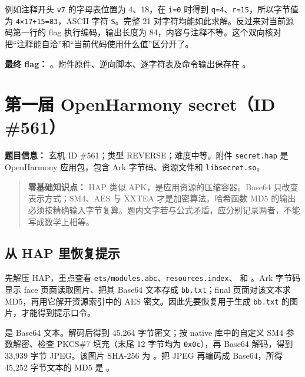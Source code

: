 例如注释开头 \texttt{v7} 的字母表位置为 4、18，在 \texttt{i=0} 时得到 \texttt{q=4}、\texttt{r=15}，所以字节值为 \texttt{4×17+15=83}，ASCII 字符 \texttt{S}。完整 21 对字符均能如此求解。反过来对当前源码第一行的 flag 执行编码，输出长度为 84，内容与注释不等。这个双向核对把``注释能自洽''和``当前代码使用什么值''区分开了。

\textbf{最终 flag：} \texttt{}。附件原件、逆向脚本、逐字符表及命令输出保存在 \texttt{}。

\section{第一届 OpenHarmony secret（ID \#561）}\label{ux7b2cux4e00ux5c4a-openharmony-secretid-561}

\textbf{题目信息：} 玄机 ID \#561；类型 REVERSE；难度中等。附件 \texttt{secret.hap} 是 OpenHarmony 应用包，包含 Ark 字节码、资源文件和 \texttt{libsecret.so}。

\begin{quote}
\textbf{零基础知识点：} HAP 类似 APK，是应用资源的压缩容器。Base64 只改变表示方式；SM4、AES 与 XXTEA 才是加密算法。哈希函数 MD5 的输出必须按精确输入字节复算。题内文字若与公式矛盾，应分别记录两者，不能写成数学上相等。
\end{quote}

\subsection{从 HAP 里恢复提示}\label{ux4ece-hap-ux91ccux6062ux590dux63d0ux793a}

先解压 HAP，重点查看 \texttt{ets/modules.abc}、\texttt{resources.index}、\texttt{} 和 \texttt{}。Ark 字节码显示 face 页面读取图片、把其 Base64 文本存成 \texttt{bb.txt}；final 页面对该文本求 MD5，再用它解开资源索引中的 AES 密文。因此先要恢复用于生成 \texttt{bb.txt} 的图片，才能得到提示口令。

\texttt{} 是 Base64 文本。解码后得到 45,264 字节密文；按 native 库中的自定义 SM4 参数解密、检查 PKCS\#7 填充（末尾 12 字节均为 \texttt{0x0c}），再 Base64 解码，得到 33,939 字节 JPEG。该图片 SHA-256 为 \texttt{}。把 JPEG 再编码成 Base64，所得 45,252 字节文本的 MD5 是 \texttt{}。

